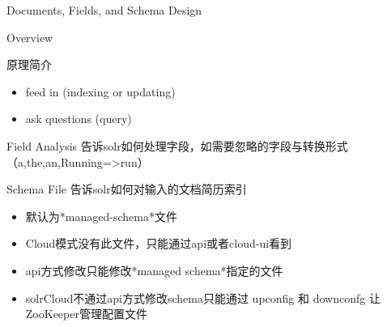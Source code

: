 \documentclass[presentation]{beamer}
\begin{document}
\begin{frame}[fragile,label={sec:orgc0e77e6}]{Documents, Fields, and Schema Design}
 \begin{block}{Overview}
\begin{block}{原理简介}
\begin{itemize}
\item feed in (indexing or updating)
\item ask questions (query)
\end{itemize}
\end{block}
\begin{block}{Field Analysis}
告诉solr如何处理字段，如需要忽略的字段与转换形式（a,the,an,Running=>run）
\end{block}
\begin{block}{Schema File}
告诉solr如何对输入的文档简历索引
\begin{itemize}
\item 默认为*managed-schema*文件
\item Cloud模式没有此文件，只能通过api或者cloud-ui看到
\item api方式修改只能修改*managed schema*指定的文件
\item solrCloud不通过api方式修改schema只能通过 upconfig 和 downconfg 让ZooKeeper管理配置文件
\end{itemize}
\end{block}
\end{block}



\end{frame}
\end{document}

